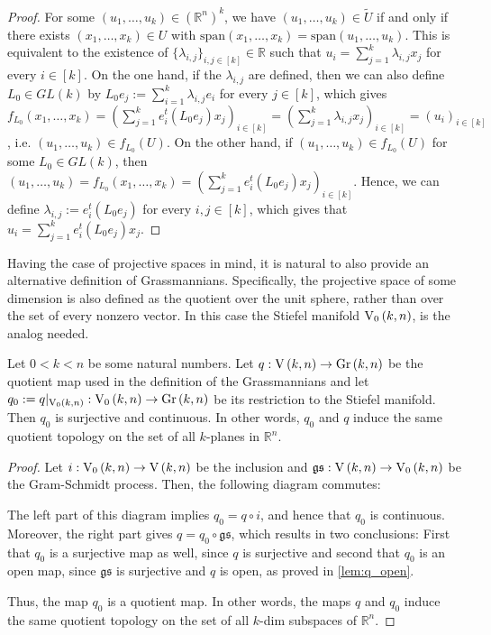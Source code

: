 \begin{proof}
For some $(u_1,\ldots,u_k)\in(\mathbb{R}^n)^k$, we have $(u_1,\ldots,u_k)\in\tilde{U}$ if and only if there exists $(x_1,\ldots,x_k)\in U$ with $\mathrm{span}(x_1,\ldots,x_k)=\mathrm{span}(u_1,\ldots,u_k)$. This is equivalent to the existence of $\{\lambda_{i,j}\}_{i,j\in[k]}\in\mathbb{R}$ such that $u_i=\sum_{j=1}^k\lambda_{i,j}x_j$ for every $i\in[k]$. On the one hand, if the $\lambda_{i,j}$ are defined, then we can also define $L_0\in GL(k)$ by $L_0e_j:=\sum_{i=1}^k\lambda_{i,j}e_i$ for every $j\in[k]$, which gives $f_{L_0}(x_1,\ldots,x_k)=\left(\sum_{j=1}^ke_i^t(L_0e_j)x_j\right)_{i\in[k]}=\left(\sum_{j=1}^k\lambda_{i,j}x_j\right)_{i\in[k]}=(u_i)_{i\in[k]}$, i.e. $(u_1,\ldots,u_k)\in f_{L_0}(U)$. On the other hand, if $(u_1,\ldots,u_k)\in f_{L_0}(U)$ for some $L_0\in GL(k)$, then $(u_1,\ldots,u_k)=f_{L_0}(x_1,\ldots,x_k)=\left(\sum_{j=1}^ke_i^t(L_0e_j)x_j\right)_{i\in[k]}$. Hence, we can define $\lambda_{i,j}:=e_i^t(L_0e_j)$ for every $i,j\in[k]$, which gives that $u_i=\sum_{j=1}^ke_i^t(L_0e_j)x_j$.
\end{proof}

Having the case of projective spaces in mind, it is natural to also provide an alternative definition of Grassmannians.
Specifically, the projective space of some dimension is also defined as the quotient over the unit sphere, rather than over the set of every nonzero vector.
In this case the Stiefel manifold $\StO{k}{n}$, is the analog needed.

\begin{proposition} Let $0<k<n$ be some natural numbers. Let $q:\St{k}{n}\to\Gr{k}{n}$ be the quotient map used in the definition of the Grassmannians and let $q_0:=q|_{\StO{k}{n}}:\StO{k}{n}\to\Gr{k}{n}$ be its restriction to the Stiefel manifold. Then $q_0$ is surjective and continuous. In other words, $q_0$ and $q$ induce the same quotient topology on the set of all $k$-planes in $\mathbb{R}^n$.
\end{proposition}
\begin{proof}
Let $i:\StO{k}{n}\to\St{k}{n}$ be the inclusion and $\mathfrak{gs}:\St{k}{n}\to\StO{k}{n}$ be the Gram-Schmidt process. Then, the following diagram commutes:
\begin{center}
\end{center}
The left part of this diagram implies $q_0=q\circ i$, and hence that $q_0$ is continuous. Moreover, the right part gives $q=q_0\circ\mathfrak{gs}$, which results in two conclusions: First that $q_0$ is a surjective map as well, since $q$ is surjective and second that $q_0$ is an open map, since $\mathfrak{gs}$ is surjective and $q$ is open, as proved in \ref{lem:q_open}.

Thus, the map $q_0$ is a quotient map. In other words, the maps $q$ and $q_0$ induce the same quotient topology on the set of all $k$-dim subspaces of $\mathbb{R}^n$.
\end{proof}

